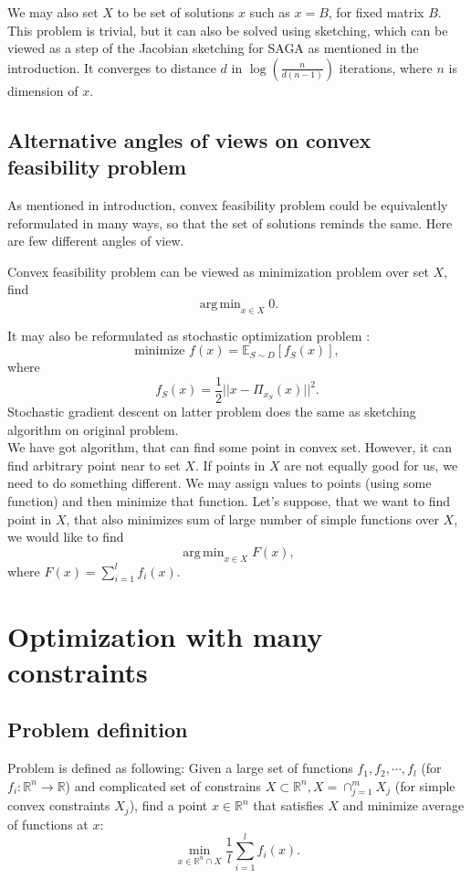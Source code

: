 \documentclass[11pt]{book}
\newcommand{\R}{\mathbb{R}}
\newcommand{\E}{\mathbb{E}}
\DeclareMathOperator*{\argmin}{arg\,min}
\begin{document}
We may also set $X$ to be set of solutions $x$ such as $x=B$, for fixed matrix $B$. This problem is trivial, but it can also be solved using sketching, which can be viewed as a step of the Jacobian sketching for SAGA as mentioned in the introduction. It converges to distance $d$ in $\log(\frac{n}{d(n-1)})$\label{xIsB} iterations, where $n$ is dimension of $x$.\\

\section{Alternative angles of views on convex feasibility problem}
As mentioned in introduction, convex feasibility problem could be equivalently reformulated in many ways, so that the set of solutions reminds the same. Here are few different angles of view.

Convex feasibility problem can be viewed as minimization problem over set $X$, find $$\argmin_{x \in X} 0.$$

It may also be reformulated as stochastic optimization problem \cite{sketchAndProject}: $$\text{minimize } f(x)=\E_{S \sim D}[f_S(x)],$$ where $$f_S(x) = \frac{1}{2}||x-\Pi_{x_S}(x)||^2.$$
Stochastic gradient descent on latter problem does the same as sketching algorithm on original problem.\\

We have got algorithm, that can find some point in convex set. However, it can find arbitrary point near to set $X$. If points in $X$ are not equally good for us, we need to do something different. We may assign values to points (using some function) and then minimize that function. Let's suppose, that we want to find point in $X$, that also minimizes sum of large number of simple functions over $X$, we would like to find $$\argmin_{x \in X} F(x),$$ where $F(x)=\sum_{i=1}^{l}f_i(x).$



\chapter{Optimization with many constraints}

\section{Problem definition}
Problem is defined as following: Given a large set of functions $f_1,f_2,\cdots,f_l$ (for $f_i: \R^n \rightarrow \R$) and complicated set of constrains $X \subset \R^n, X = \cap_{j=1}^m X_j$ (for simple convex constraints $X_j$), find a point $x \in \R^n$ that satisfies $X$ and minimize average of functions at $x$: $$ \min_{x \in \R^n \cap X} \frac{1}{l}\sum_{i=1}^l f_i(x).$$
\end{document}
